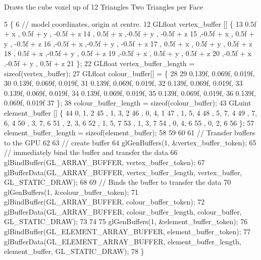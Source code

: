 Draws the cube voxel up of 12 Triangles Two Triangles per Face
\begin{DoxyCode}
5                                                      \{
6   \textcolor{comment}{// model coordinates, origin at centre.}
12 \textcolor{comment}{}  GLfloat vertex\_buffer [] \{
13       0.5f + x  , 0.5f + y  , -0.5f + z
14     , 0.5f + x  ,-0.5f + y  , -0.5f + z
15     ,-0.5f + x  , 0.5f + y  , -0.5f + z
16     ,-0.5f + x  ,-0.5f + y  , -0.5f + z
17     , 0.5f + x  , 0.5f + y  ,  0.5f + z 
18     , 0.5f + x  ,-0.5f + y  ,  0.5f + z
19     ,-0.5f + x  , 0.5f + y  ,  0.5f + z
20     ,-0.5f + x  ,-0.5f + y  ,  0.5f + z
21   \};
22   GLfloat vertex\_buffer\_length = \textcolor{keyword}{sizeof}(vertex\_buffer);
27   GLfloat colour\_buffer[] = \{
28 
29      0.139f, 0.069f, 0.019f,
30      0.139f, 0.069f, 0.019f,
31      0.139f, 0.069f, 0.019f,
32      0.139f, 0.069f, 0.019f,
33      0.139f, 0.069f, 0.019f,
34      0.139f, 0.069f, 0.019f,
35      0.139f, 0.069f, 0.019f,
36      0.139f, 0.069f, 0.019f
37   \};
38   colour\_buffer\_length = \textcolor{keyword}{sizeof}(colour\_buffer);
43   GLuint element\_buffer []  \{
44       0, 1, 2   
45     , 1, 3, 2
46     , 0, 4, 1   
47     , 1, 5, 4   
48     , 5, 7, 4   
49     , 7, 6, 4   
50     , 3, 7, 6   
51     , 2, 3, 6   
52     , 1, 5, 7   
53     , 1, 3, 7   
54     , 0, 4, 6   
55     , 0, 2, 6   
56   \};
57   element\_buffer\_length = \textcolor{keyword}{sizeof}(element\_buffer);
58 
59 
60 
61   \textcolor{comment}{// Transfer buffers to the GPU}
62 
63   \textcolor{comment}{// create buffer}
64   glGenBuffers(1, &vertex\_buffer\_token);
65   \textcolor{comment}{// immediately bind the buffer and transfer the data}
66   glBindBuffer(GL\_ARRAY\_BUFFER, vertex\_buffer\_token);
67   glBufferData(GL\_ARRAY\_BUFFER, vertex\_buffer\_length, vertex\_buffer, GL\_STATIC\_DRAW);
68   
69   \textcolor{comment}{// Binds the buffer to transfer the data}
70   glGenBuffers(1, &colour\_buffer\_token);
71   glBindBuffer(GL\_ARRAY\_BUFFER, colour\_buffer\_token);
72   glBufferData(GL\_ARRAY\_BUFFER, colour\_buffer\_length, colour\_buffer, GL\_STATIC\_DRAW);
73 
74 
75   glGenBuffers(1, &element\_buffer\_token);
76   glBindBuffer(GL\_ELEMENT\_ARRAY\_BUFFER, element\_buffer\_token);
77   glBufferData(GL\_ELEMENT\_ARRAY\_BUFFER, element\_buffer\_length, element\_buffer, GL\_STATIC\_DRAW);
78 \}
\end{DoxyCode}
\hypertarget{classCubeAsset_ab3ab9a5da82cbf8537a28652410093b1}{}
